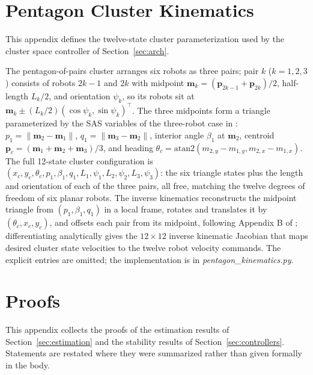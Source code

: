 \documentclass[lettersize,journal]{IEEEtran}
\begin{document}
\section{Pentagon Cluster Kinematics}
\label{app:kinematics}

This appendix defines the twelve-state cluster parameterization used
by the cluster space controller of Section~\ref{sec:arch}.

The pentagon-of-pairs cluster arranges six robots as three pairs; pair
$k$ ($k = 1, 2, 3$) consists of robots $2k-1$ and $2k$ with midpoint
$\mathbf{m}_k = (\mathbf{p}_{2k-1} + \mathbf{p}_{2k})/2$, half-length
$L_k/2$, and orientation $\psi_k$, so its robots sit at $\mathbf{m}_k
\pm (L_k/2)(\cos\psi_k, \sin\psi_k)^\top$. The three midpoints form a
triangle parameterized by the SAS variables of the three-robot case in
\cite{14}: $p_1 = \|\mathbf{m}_2 - \mathbf{m}_1\|$, $q_1 =
\|\mathbf{m}_3 - \mathbf{m}_2\|$, interior angle $\beta_1$ at
$\mathbf{m}_2$, centroid $\mathbf{p}_c = (\mathbf{m}_1 + \mathbf{m}_2 +
\mathbf{m}_3)/3$, and heading $\theta_c = \text{atan2}(m_{2,y} -
m_{1,y}, m_{2,x} - m_{1,x})$. The full 12-state cluster configuration
is $(x_c, y_c, \theta_c, p_1, \beta_1, q_1, L_1, \psi_1, L_2, \psi_2,
L_3, \psi_3)$: the six triangle states plus the length and orientation
of each of the three pairs, all free, matching the twelve degrees of
freedom of six planar robots.
The inverse kinematics reconstructs the midpoint triangle
from $(p_1, \beta_1, q_1)$ in a local frame, rotates and translates it
by $(\theta_c, x_c, y_c)$, and offsets each pair from its midpoint,
following Appendix B of \cite{14}; differentiating analytically gives
the $12 \times 12$ inverse kinematic Jacobian that maps desired cluster
state velocities to the twelve robot velocity commands. The explicit
entries are omitted; the implementation is in
\textit{pentagon\_kinematics.py}.


\section{Proofs}
\label{app:proofs}

This appendix collects the proofs of the estimation results of
Section~\ref{sec:estimation} and the stability results of
Section~\ref{sec:controllers}. Statements are restated where they were
summarized rather than given formally in the body.
\end{document}
